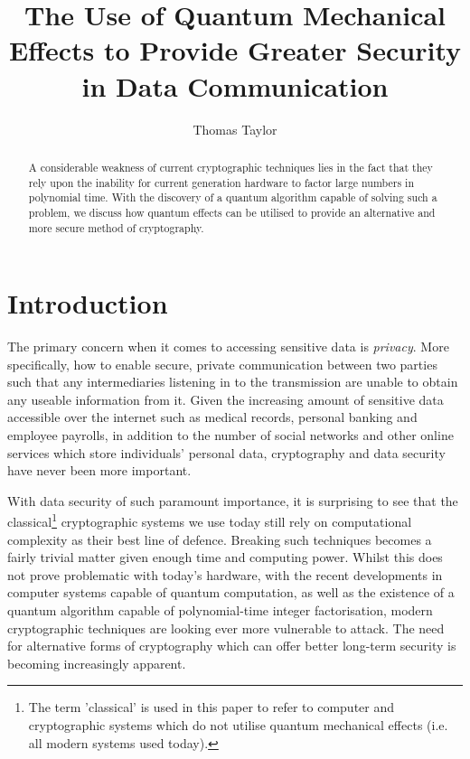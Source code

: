 \documentclass[runningheads,a4paper]{llncs}
\begin{document}
\mainmatter  

\title{The Use of Quantum Mechanical Effects to Provide Greater Security in Data Communication}
\author{Thomas Taylor\\ \mail}

\maketitle

\begin{abstract}
A considerable weakness of current cryptographic techniques lies in the fact that they rely upon the inability for current generation hardware to factor large numbers in polynomial time. With the discovery of a quantum algorithm capable of solving such a problem, we discuss how quantum effects can be utilised to provide an alternative and more secure method of cryptography.

\end{abstract}

\section{Introduction}

The primary concern when it comes to accessing sensitive data is \emph{privacy}. More specifically, how to enable secure, private communication between two parties such that any intermediaries listening in to the transmission are unable to obtain any useable information from it\cite{Rivest:1990fk}. Given the increasing amount of sensitive data accessible over the internet such as medical records, personal banking and employee payrolls, in addition to the number of social networks and other online services which store individuals' personal data, cryptography and data security have never been more important.

With data security of such paramount importance, it is surprising to see that the classical\footnote[1]{The term 'classical' is used in this paper to refer to computer and cryptographic systems which do not utilise quantum mechanical effects (i.e. all modern systems used today).} cryptographic systems we use today still rely on computational complexity as their best line of defence. Breaking such techniques becomes a fairly trivial matter given enough time and computing power. Whilst this does not prove problematic with today's hardware, with the recent developments in computer systems capable of quantum computation\cite{Lu:2007uq}, as well as the existence of a quantum algorithm capable of polynomial-time integer factorisation\cite{Shor:1994fk}, modern cryptographic techniques are looking ever more vulnerable to attack. The need for alternative forms of cryptography which can offer better long-term security is becoming increasingly apparent.
\end{document}
